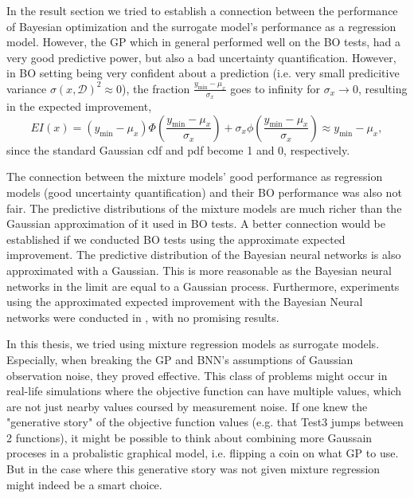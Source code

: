 In the result section we tried to establish a connection between the performance of Bayesian optimization and the surrogate
model's performance as a regression model. However, the GP which in general performed well on the BO tests, had a very
good predictive power, but also a bad uncertainty quantification. However, in BO setting being very confident about a 
prediction (i.e. very small predicitive variance $\sigma(x,\mathcal{D})^2 \approx 0$), the fraction
$\frac{y_{\min}-\mu_x}{\sigma_x}$ goes to infinity for $\sigma_x \rightarrow 0$, resulting in the expected improvement, 
$$EI(x) = (y_{\min}-\mu_x)\Phi\left(\frac{y_{\min}-\mu_x}{\sigma_x}\right)+ \sigma_x
\phi\left(\frac{y_{\min}-\mu_x}{\sigma_x}\right) \approx y_{\min}-\mu_x,$$ since the standard
Gaussian cdf and pdf become 1 and 0, respectively. 

The connection between the mixture models' good performance as regression models (good
uncertainty quantification) and their BO performance was also not fair. The predictive distributions
of the mixture models are much richer than the Gaussian approximation of it used in BO tests. 
A better connection would be established if we conducted BO tests using the approximate expected
improvement. The predictive distribution of the Bayesian neural networks is also approximated with a
Gaussian. This is more reasonable as the Bayesian neural networks in the limit are equal to a
Gaussian process. Furthermore, experiments using the approximated expected improvement with the
Bayesian Neural networks were conducted in \cite{PhDthesis}, with no promising results. 




In this thesis, we tried using mixture regression models as surrogate models. Especially, when breaking the 
GP and BNN's assumptions of Gaussian observation noise, they proved effective. This class of problems
might occur in real-life simulations where the objective function can have multiple values, which are not
just nearby values coursed by measurement noise. If one knew the "generative story" of the
objective function values (e.g. that Test3 jumps between 2 functions), it might be possible to think about combining more Gaussain proceses in a probalistic
graphical model, i.e. flipping a coin on what GP to use. But in the case where this generative story was not given 
mixture regression might indeed be a smart choice. 


